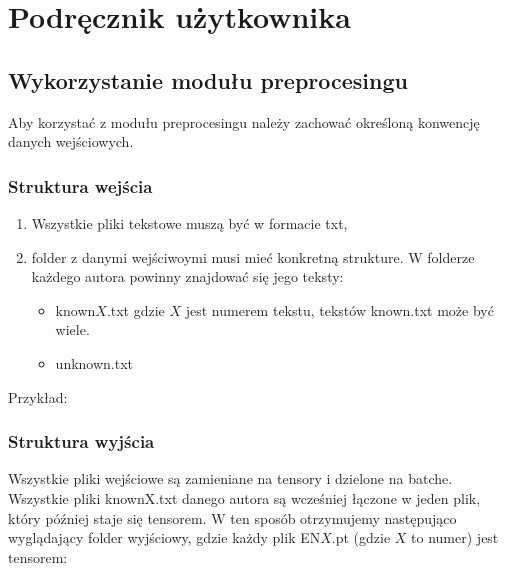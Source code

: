 \newpage
\section{Podręcznik użytkownika}
\subsection{Wykorzystanie modułu preprocesingu}

Aby korzystać z modułu preprocesingu należy zachować określoną konwencję danych wejściowych. 

\subsubsection{Struktura wejścia}

\begin{enumerate}
	\item Wszystkie pliki tekstowe muszą być w formacie txt,
	\item folder z danymi wejściwoymi musi mieć konkretną strukture. W folderze każdego autora
		  powinny znajdować się jego teksty: 
			\begin{itemize}
				\item known$X$.txt gdzie $X$ jest numerem tekstu, tekstów known.txt może być wiele.
				\item unknown.txt
			\end{itemize}
\end{enumerate}

Przykład: 

\myspace
{}
\myspace

\newpage
\subsubsection{Struktura wyjścia}

Wszystkie pliki wejściowe są zamieniane na tensory i dzielone na batche. Wszystkie pliki knownX.txt 
danego autora są wcześniej łączone w jeden plik, który później staje się tensorem. W ten sposób 
otrzymujemy następująco wyglądający folder wyjściowy, gdzie każdy plik EN$X$.pt (gdzie $X$ to numer)
 jest tensorem:

\myspace
{}
\myspace


